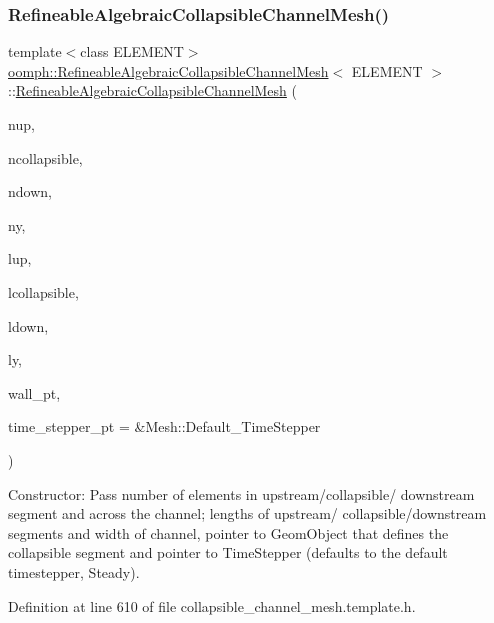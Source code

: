 \subsubsection{\texorpdfstring{Refineable\+Algebraic\+Collapsible\+Channel\+Mesh()}{RefineableAlgebraicCollapsibleChannelMesh()}\hspace{0.1cm}{\footnotesize\ttfamily [1/2]}}
{\footnotesize\ttfamily template$<$class E\+L\+E\+M\+E\+NT$>$ \\
\hyperlink{classoomph_1_1RefineableAlgebraicCollapsibleChannelMesh}{oomph\+::\+Refineable\+Algebraic\+Collapsible\+Channel\+Mesh}$<$ E\+L\+E\+M\+E\+NT $>$\+::\hyperlink{classoomph_1_1RefineableAlgebraicCollapsibleChannelMesh}{Refineable\+Algebraic\+Collapsible\+Channel\+Mesh} (\begin{DoxyParamCaption}\item[{const unsigned \&}]{nup,  }\item[{const unsigned \&}]{ncollapsible,  }\item[{const unsigned \&}]{ndown,  }\item[{const unsigned \&}]{ny,  }\item[{const double \&}]{lup,  }\item[{const double \&}]{lcollapsible,  }\item[{const double \&}]{ldown,  }\item[{const double \&}]{ly,  }\item[{Geom\+Object $\ast$}]{wall\+\_\+pt,  }\item[{Time\+Stepper $\ast$}]{time\+\_\+stepper\+\_\+pt = {\ttfamily \&Mesh\+:\+:Default\+\_\+TimeStepper} }\end{DoxyParamCaption})\hspace{0.3cm}{\ttfamily [inline]}}



Constructor\+: Pass number of elements in upstream/collapsible/ downstream segment and across the channel; lengths of upstream/ collapsible/downstream segments and width of channel, pointer to Geom\+Object that defines the collapsible segment and pointer to Time\+Stepper (defaults to the default timestepper, Steady). 



Definition at line 610 of file collapsible\+\_\+channel\+\_\+mesh.\+template.\+h.

\mbox{\label{classoomph_1_1RefineableAlgebraicCollapsibleChannelMesh_af36c924e3d8cc2a8659db4185d6612be}} 
